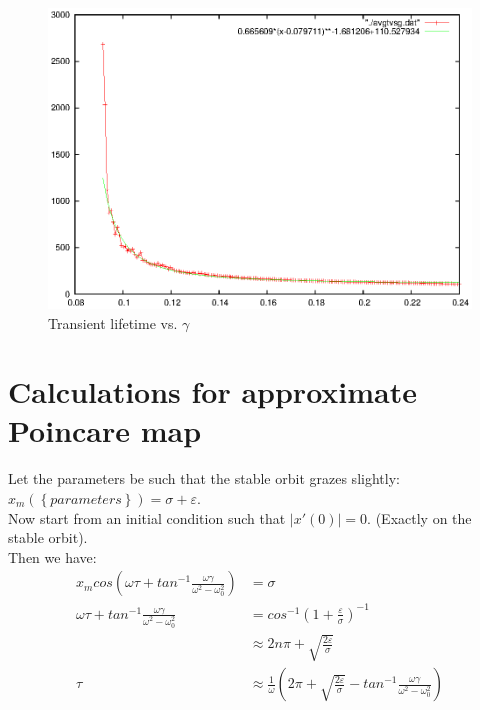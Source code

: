 \documentclass{book}
\renewcommand{\(}{\begin{columns}}
\renewcommand{\)}{\end{columns}}
\newcommand{\<}[1]{\begin{column}{#1}}
\renewcommand{\>}{\end{column}}
\begin{document}
\begin{figure}
\caption{Transient lifetime vs.  $\gamma$}
\begin{center}
\includegraphics[width=0.8\columnwidth]{trans_life_vsg_matches_somewhat}
\end{center}
\end{figure}

\appendix
\chapter{Calculations for approximate Poincare map}
\label{app-calc-poinc}
Let the parameters be such that the stable orbit grazes slightly:
$x_m(\left\{parameters\right\})=\sigma+\varepsilon$.  \\

Now start from an initial condition such that $\left|x'(0)\right|=0$.  
(Exactly on the stable orbit).\\

Then we have:
\begin{align*}
x_mcos\left(\omega \tau+tan^{-1}\frac{\omega \gamma}{\omega^2-\omega_0^2}\right)&=\sigma\\
\omega \tau+tan^{-1}\frac{\omega \gamma}{\omega^2-\omega_0^2}&=cos^{-1}\left(1+\frac{\varepsilon}{\sigma}\right)^{-1}\\
&\approx2n\pi+\sqrt{\frac{2\varepsilon}{\sigma}}\\
\tau&\approx \frac{1}{\omega}\left(2\pi+\sqrt{\frac{2\varepsilon}{\sigma}}-tan^{-1}\frac{\omega \gamma}{\omega^2-\omega_0^2}\right)
\end{align*}
 
\end{document}
